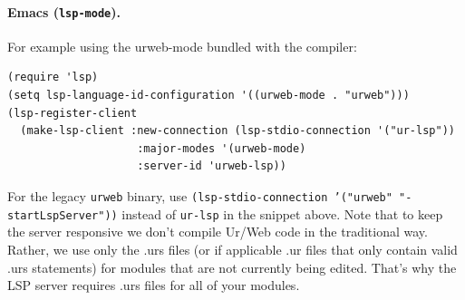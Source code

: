 \documentclass{article}
\newcommand{\cd}[1]{\texttt{#1}}
\begin{document}
\paragraph{Emacs (\texttt{lsp-mode}).}
For example using the urweb-mode bundled with the compiler:
\begin{verbatim}
(require 'lsp)
(setq lsp-language-id-configuration '((urweb-mode . "urweb")))
(lsp-register-client
  (make-lsp-client :new-connection (lsp-stdio-connection '("ur-lsp"))
                    :major-modes '(urweb-mode)
                    :server-id 'urweb-lsp))
\end{verbatim}
For the legacy \cd{urweb} binary, use \texttt{(lsp-stdio-connection '("urweb" "-startLspServer"))} instead of \texttt{ur-lsp} in the snippet above.
Note that to keep the server responsive we don't compile Ur/Web code in the traditional way. Rather, we use only the .urs files (or if applicable .ur files that only contain valid .urs statements) for modules that are not currently being edited. That's why the LSP server requires .urs files for all of your modules.

\medskip
\end{document}
